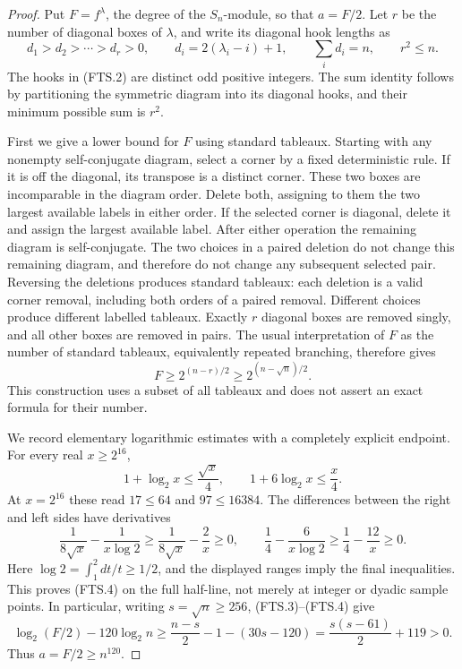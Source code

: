 \begin{proof}
Put \(F=f^\lambda\), the degree of the \(S_n\)-module, so that
\(a=F/2\).  Let \(r\) be the number of diagonal boxes of \(\lambda\),
and write its diagonal hook lengths as
\[
 d_1>d_2>\cdots>d_r>0,\qquad
 d_i=2(\lambda_i-i)+1,\qquad
 \sum_i d_i=n,\qquad r^2\le n.
 \tag{FTS.2}
\]
The hooks in (FTS.2) are distinct odd positive integers.  The sum
identity follows by partitioning the symmetric diagram into its
diagonal hooks, and their minimum possible sum is \(r^2\).

First we give a lower bound for \(F\) using standard tableaux.
Starting with any nonempty self-conjugate diagram, select a corner
by a fixed deterministic rule.  If it is off the diagonal, its
transpose is a distinct corner.  These two boxes are incomparable
in the diagram order.  Delete both, assigning to them the two
largest available labels in either order.  If the selected corner
is diagonal, delete it and assign the largest available label.
After either operation the remaining diagram is self-conjugate.
The two choices in a paired deletion do not change this remaining
diagram, and therefore do not change any subsequent selected pair.
Reversing the deletions produces standard tableaux: each deletion
is a valid corner removal, including both orders of a paired removal.
Different choices produce different labelled tableaux.
Exactly \(r\) diagonal boxes are removed singly, and all other
boxes are removed in pairs.  The usual interpretation of \(F\) as
the number of standard tableaux, equivalently repeated branching,
therefore gives
\[
                    F\ge 2^{(n-r)/2}
                       \ge2^{(n-\sqrt n)/2}.
                    \tag{FTS.3}
\]
This construction uses a subset of all tableaux and does not assert
an exact formula for their number.

We record elementary logarithmic estimates with a completely
explicit endpoint.  For every real \(x\ge2^{16}\),
\[
 1+\log_2x\le\frac{\sqrt x}{4},\qquad
 1+6\log_2x\le\frac{x}{4}.
 \tag{FTS.4}
\]
At \(x=2^{16}\) these read \(17\le64\) and \(97\le16384\).
The differences between the right and left sides have derivatives
\[
 \frac1{8\sqrt x}-\frac1{x\log2}
   \ge\frac1{8\sqrt x}-\frac2x\ge0,\qquad
 \frac14-\frac6{x\log2}\ge\frac14-\frac{12}x\ge0.
 \tag{FTS.5}
\]
Here \(\log2=\int_1^2dt/t\ge1/2\), and the displayed ranges imply
the final inequalities.  This proves (FTS.4) on the full half-line,
not merely at integer or dyadic sample points.
In particular, writing \(s=\sqrt n\ge256\), (FTS.3)--(FTS.4) give
\[
 \log_2(F/2)-120\log_2n
 \ge\frac{n-s}{2}-1-(30s-120)
 =\frac{s(s-61)}2+119>0.
 \tag{FTS.6}
\]
Thus \(a=F/2\ge n^{120}\).


\end{proof}

